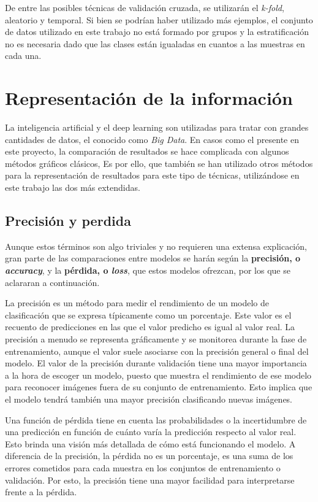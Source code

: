 \documentclass{report}
\begin{document}
De entre las posibles técnicas de validación cruzada, se utilizarán el \textit{k-fold}, aleatorio y temporal. Si bien se podrían haber utilizado más ejemplos, el conjunto de datos utilizado en  este trabajo no está formado por grupos y la estratificación no es necesaria dado que las clases están igualadas en cuantos a las muestras en cada una.



\section{Representación de la información}

La inteligencia artificial y el deep learning son utilizadas para tratar con grandes cantidades de datos, el conocido como \textit{Big Data}. En casos como el presente en este proyecto, la comparación de resultados se hace complicada con algunos métodos gráficos clásicos, Es por ello, que también se han utilizado otros métodos para la representación de resultados para este tipo de técnicas, utilizándose en este trabajo las dos más extendidas.


\subsection{Precisión y perdida}


Aunque estos términos son algo triviales y no requieren una extensa explicación, gran parte de las comparaciones entre modelos se harán según la \textbf{precisión, o \textit{accuracy}}, y la \textbf{pérdida, o \textit{loss}}, que estos modelos ofrezcan, por los que se aclararan a continuación.

La precisión es un método para medir el rendimiento de un modelo de clasificación que se expresa típicamente como un porcentaje. Este valor es el recuento de predicciones en las que el valor predicho es igual al valor real. La precisión a menudo se representa gráficamente y se monitorea durante la fase de entrenamiento, aunque el valor suele asociarse con la precisión general o final del modelo. El valor de la precisión durante validación tiene una mayor importancia a la hora de escoger un modelo, puesto que muestra el rendimiento de ese modelo para reconocer imágenes fuera de su conjunto de entrenamiento. Esto implica que el modelo tendrá también una mayor precisión clasificando nuevas imágenes.

Una función de pérdida tiene en cuenta las probabilidades o la incertidumbre de una predicción en función de cuánto varía la predicción respecto al valor real. Esto brinda una visión más detallada de cómo está funcionando el modelo. A diferencia de la precisión, la pérdida no es un porcentaje, es una suma de los errores cometidos para cada muestra en los conjuntos de entrenamiento o validación. Por esto, la precisión tiene una mayor facilidad para interpretarse frente a la pérdida.
\end{document}

